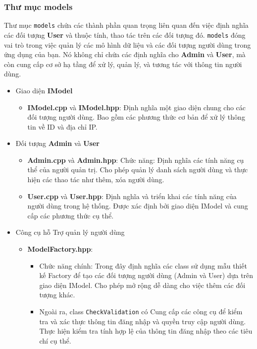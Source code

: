 \subsubsection{Thư mục models}
Thư mục \verb|models| chứa các thành phần quan trọng liên quan đến việc định nghĩa các đối tượng \textbf{User} và thuộc tính, thao tác trên các đối tượng đó. \verb|models| đóng vai trò trong việc quản lý các  mô hình dữ liệu và các đối tượng người dùng trong ứng dụng của bạn. Nó không chỉ chứa các định nghĩa cho \textbf{Admin} và \textbf{User}, mà còn cung cấp cơ sở hạ tầng để xử lý, quản lý, và tương tác với thông tin người dùng.
\begin{itemize}
	\item Giao diện \textbf{IModel}
	\begin{itemize}
		\item \textbf{IModel.cpp} và \textbf{IModel.hpp}: Định nghĩa một giao diện chung cho các đối tượng người dùng. Bao gồm các phương thức cơ bản để xử lý thông tin về ID và địa chỉ IP.
	\end{itemize}
	\item Đối tượng \textbf{Admin} và \textbf{User}
	\begin{itemize}
		\item \textbf{Admin.cpp} và \textbf{Admin.hpp}:  Chức năng: Định nghĩa các tính năng cụ thể của người quản trị. Cho phép quản lý danh sách người dùng và thực hiện các thao tác như thêm, xóa người dùng.
		\item \textbf{User.cpp} và \textbf{User.hpp}: Định nghĩa và triển khai các tính năng của người dùng trong hệ thống. Được xác định bởi giao diện IModel và cung cấp các phương thức cụ thể.
	\end{itemize}
	\item Công cụ hỗ Trợ quản lý người dùng
	\begin{itemize}
		\item \textbf{ModelFactory.hpp}: 
		\begin{itemize}
			\item Chức năng chính: Trong đây định nghĩa các class sử dụng mẫu thiết kế Factory để tạo các đối tượng người dùng (Admin và User) dựa trên giao diện IModel. Cho phép mở rộng dễ dàng cho việc thêm các đối tượng khác.
			\item Ngoài ra, class \verb|CheckValidation| có Cung cấp các công cụ để kiểm tra và xác thực thông tin đăng nhập và quyền truy cập người dùng. Thực hiện kiểm tra tính hợp lệ của thông tin đăng nhập theo các tiêu chí cụ thể. 
		\end{itemize} 
	\end{itemize}
\end{itemize}

